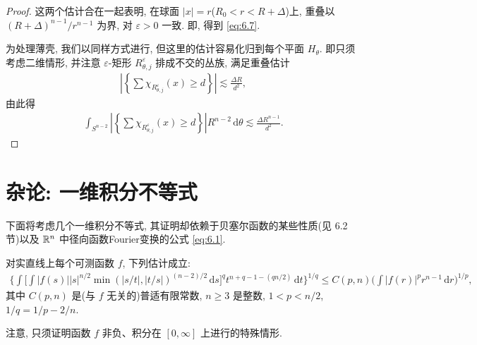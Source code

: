 \begin{proof}
这两个估计合在一起表明, 在球面 $|x|=r$($R_0<r<R+\Delta$)上, 重叠以 $(R+\Delta)^{n-1}/r^{n-1}$ 为界, 对 $\varepsilon>0$ 一致. 即, 得到 \eqref{eq:6.7}.

为处理薄壳, 我们以同样方式进行, 但这里的估计容易化归到每个平面 $H_{\theta}$. 即只须考虑二维情形, 并注意 $\varepsilon$-矩形 $R_{\theta,j}^{\varepsilon}$ 排成不交的丛族, 满足重叠估计
\begin{align*}
  \left|\left\{\sum\chi_{R_{\theta,j}^{\varepsilon}}(x)\geq d\right\}\right|\lesssim\frac{\Delta R}{d^{2}},
\end{align*}
由此得
\begin{align*}
  \int_{S^{n-2}}\left|\left\{\sum\chi_{R_{\theta,j}^{\varepsilon}}(x)\geq d\right\}\right|R^{n-2}\,\mathrm{d}\theta
  \lesssim\frac{\Delta R^{n-1}}{d^{2}}.
\end{align*}
\end{proof}

\section{杂论: 一维积分不等式}

下面将考虑几个一维积分不等式, 其证明却依赖于贝塞尔函数的某些性质(见 6.2 节)以及 $\mathbb{R}^n$ 中径向函数Fourier变换的公式 \eqref{eq:6.1}.

\begin{theorem}\label{thm:6.10}
对实直线上每个可测函数 $f$, 下列估计成立:
\begin{align*}
  \Big\{\int\Big[\int|f(s)||s|^{n/2}\min(|s/t|,|t/s|)^{(n-2)/2}\,\mathrm{d}s\Big]^{q}
  t^{n+q-1-(qn/2)}\,\mathrm{d}t\Big\}^{1/q}
  \leq C(p,n)\Big(\int|f(r)|^{p}r^{n-1}\,\mathrm{d}r\Big)^{1/p},
\end{align*}
其中 $C(p,n)$ 是(与 $f$ 无关的)普适有限常数, $n \geq 3$ 是整数, $1 < p < n/2$, $1/q = 1/p - 2/n$.
\end{theorem}

注意, 只须证明函数 $f$ 非负、积分在 $[0, \infty]$ 上进行的特殊情形.

